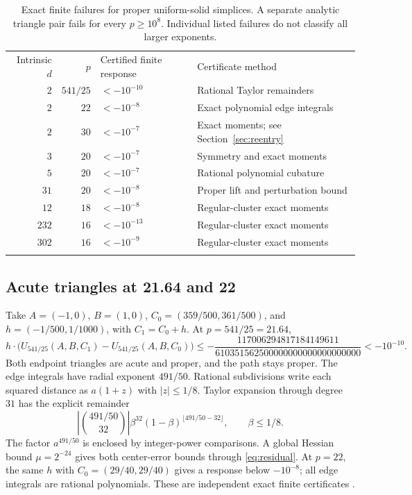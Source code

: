 \documentclass[11pt]{article}
\theoremstyle{definition}
\newcommand{\toprule}{\noalign{\hrule height 0.8pt\vskip4pt}}
\newcommand{\midrule}{\noalign{\vskip3pt\hrule height 0.4pt\vskip3pt}}
\newcommand{\bottomrule}{\noalign{\vskip3pt\hrule height 0.8pt}}
\begin{document}
\begin{table}[htbp]
\centering
\begin{tabular}{@{}rrll@{}}
\toprule
Intrinsic $d$ & $p$ & Certified finite response & Certificate method\\
\midrule
$2$ & $541/25$ & $<-10^{-10}$ & Rational Taylor remainders\\
$2$ & $22$ & $<-10^{-8}$ & Exact polynomial edge integrals\\
$2$ & $30$ & $<-10^{-7}$ & Exact moments; see Section~\ref{sec:reentry}\\
$3$ & $20$ & $<-10^{-7}$ & Symmetry and exact moments\\
$5$ & $20$ & $<-10^{-7}$ & Rational polynomial cubature\\
$31$ & $20$ & $<-10^{-8}$ & Proper lift and perturbation bound\\
$12$ & $18$ & $<-10^{-8}$ & Regular-cluster exact moments\\
$232$ & $16$ & $<-10^{-13}$ & Regular-cluster exact moments\\
$302$ & $16$ & $<-10^{-9}$ & Regular-cluster exact moments\\
\bottomrule
\end{tabular}
\caption{Exact finite failures for proper uniform-solid simplices. A
separate analytic triangle pair fails for every $p\ge10^8$. Individual
listed failures do not classify all larger exponents.}
\label{tab:failures}
\end{table}

\subsection{Acute triangles at 21.64 and 22}
Take $A=(-1,0)$, $B=(1,0)$, $C_0=(359/500,361/500)$, and
$h=(-1/500,1/1000)$, with $C_1=C_0+h$. At $p=541/25=21.64$,
\begin{equation}\label{eq:trianglefailure}
 h\cdot\bigl(U_{541/25}(A,B,C_1)-U_{541/25}(A,B,C_0)\bigr)
 \le-\frac{117006294817184149611}{610351562500000000000000000000}
 <-10^{-10}.
\end{equation}
Both endpoint triangles are acute and proper, and the path stays proper.
The edge integrals have radial exponent $491/50$. Rational subdivisions
write each squared distance as $a(1+z)$ with $|z|\le1/8$.
Taylor expansion through degree $31$ has the explicit remainder
\[
 \left|\binom{491/50}{32}\right|\beta^{32}
       (1-\beta)^{\lfloor491/50-32\rfloor},\qquad \beta\le1/8.
\]
The factor $a^{491/50}$ is enclosed by integer-power comparisons. A
global Hessian bound $\mu=2^{-24}$ gives both center-error bounds through
\eqref{eq:residual}. At $p=22$, the same $h$ with
$C_0=(29/40,29/40)$ gives a response below $-10^{-8}$; all edge integrals
are rational polynomials. These are independent exact finite certificates
\cite{FirstInvestigation}.
\end{document}
